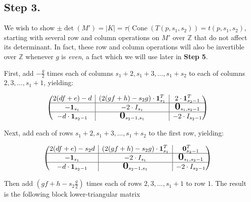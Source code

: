 \documentclass[10pt,reqno]{amsart}
\newcommand{\bigzero}{\mbox{\normalfont\Large\bfseries 0}}
\newcommand{\rvline}{\hspace*{-\arraycolsep}\vline\hspace*{-\arraycolsep}}
\newcommand{\Z}{\mathbb{Z}}
\DeclareMathOperator{\Cone}{Cone}
\def\onesvector{\mathbf{1}}
\def\zerovector{\mathbf{0}}
\begin{document}
\subsection{Step 3.}
We wish to show 
$\pm \det(M')=|K|=\tau(\Cone(T(p,s_1,s_2))=t(p,s_1,s_2)$,
starting with several row and column operations on $M'$ over $\mathbb{Z}$ that do not affect its determinant. In fact, these row and column operations will also be invertible over $\Z$ whenever $g$ is {\it even}, a fact which we will use later in {\bf Step 5}.


First, add $-\frac{g}{2}$ times each of columns $s_1+2,s_1+3,\ldots, s_1+s_2$ to each of columns $2,3,\ldots,s_1+1$, yielding:
    
\begin{equation*}\label{M1}
\begin{pmatrix*}

2(df+e)-d  & \rvline & (2(gf+h)-s_2g) \cdot \onesvector^T_{s_1} & \rvline & 2\cdot \onesvector^T_{s_2-1} \\
\hline
-\onesvector_{s_1} & \rvline & -2\cdot I_{s_1} & \rvline & \bigzero_{s_1,s_2-1}  \\
\hline
-d\cdot \onesvector_{s_2-1} & \rvline & \bigzero_{s_2-1,s_1} & \rvline & -2\cdot I_{s_2-1}

\end{pmatrix*}
\end{equation*}

Next, add each of rows $s_1+2,s_1+3,\ldots,s_1+s_2$ to the first row, yielding:
        
\begin{equation*}\label{M2}
\begin{pmatrix*}

2(df+e)-s_2d  & \rvline & (2(gf+h)-s_2g) \cdot \onesvector^T_{s_1} & \rvline &  \zerovector^T_{s_2-1} \\
\hline
-\onesvector_{s_1} & \rvline & -2\cdot I_{s_1} & \rvline & \bigzero_{s_1,s_2-1}  \\
\hline
-d\cdot \onesvector_{s_2-1} & \rvline & \bigzero_{s_2-1,s_1} & \rvline & -2\cdot I_{s_2-1}

\end{pmatrix*}
\end{equation*}


Then add $(gf+h-s_2\frac{g}{2})$ times each of rows $2,3,\ldots,s_1+1$ to row $1$.  The result is the following block lower-triangular matrix
        
\end{document}
